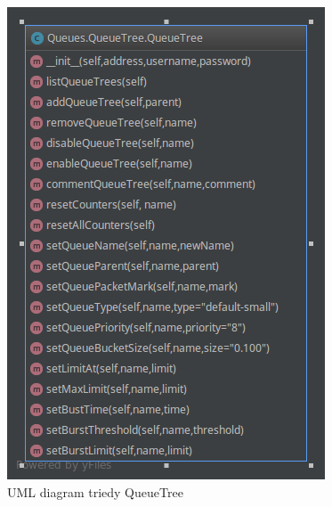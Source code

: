 \begin{figure}[H]
\centering
\includegraphics[scale=0.6]{../text/QueueTree.png}
\caption{UML diagram triedy QueueTree}
\label{fig:queueTree}
\end{figure}
